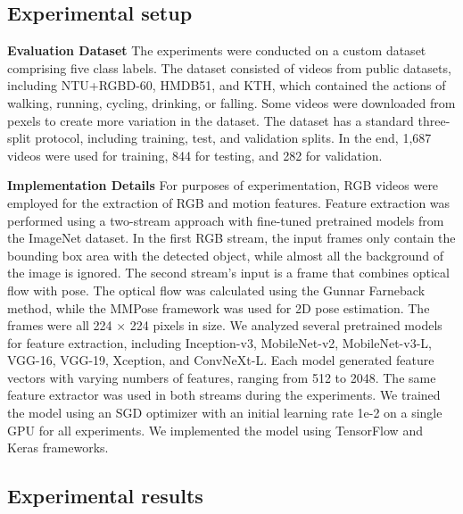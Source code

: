 \documentclass[mathematics,article,submit,pdftex,moreauthors]{Definitions/mdpi}
\begin{document}
\subsection{Experimental setup}
\textbf{Evaluation Dataset} The experiments were conducted on a custom dataset comprising five class labels. The dataset consisted of videos from public datasets, including NTU+RGBD-60, HMDB51, and KTH, which contained the actions of walking, running, cycling, drinking, or falling. Some videos were downloaded from pexels \cite{pexels} to create more variation in the dataset. %
The dataset has a standard three-split protocol, including training, test, and validation splits. In the end, 1,687 videos were used for training, 844 for testing, and 282 for validation.

\textbf{Implementation Details} %
For purposes of experimentation, RGB videos were employed for the extraction of RGB and motion features. Feature extraction was performed using a two-stream approach with fine-tuned pretrained models from the ImageNet dataset. In the first RGB stream, the input frames only contain the bounding box area with the detected object, while almost all the background of the image is ignored. The second stream's input is a frame that combines optical flow with pose. The optical flow was calculated using the Gunnar Farneback method, while the MMPose framework was used for 2D pose estimation. The frames were all 224 $\times$ 224 pixels in size.  We analyzed several pretrained models for feature extraction, including Inception-v3, MobileNet-v2, MobileNet-v3-L, VGG-16, VGG-19, Xception, and ConvNeXt-L. Each model generated feature vectors with varying numbers of features, ranging from 512 to 2048. The same feature extractor was used in both streams during the experiments. %
We trained the model using an SGD optimizer with an initial learning rate 1e-2 on a single GPU for all experiments. We implemented the model using TensorFlow and Keras frameworks.



\subsection{Experimental results}
\label{sec:results}
\end{document}
